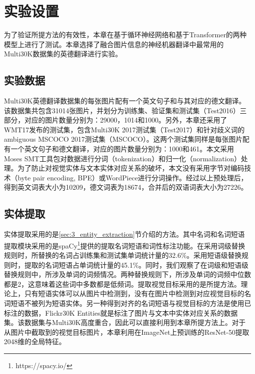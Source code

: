 \section{实验设置}
为了验证所提方法的有效性，本章在基于循环神经网络和基于Transformer的两种模型上进行了测试。本章选择了融合图片信息的神经机器翻译中最常用的Multi30K数据集的英德翻译进行实验。

\subsection{实验数据}
Multi30K英德翻译数据集的每张图片配有一个英文句子和与其对应的德文翻译。该数据集共包含31014张图片，并划分为训练集、验证集和测试集（Test2016）三部分，对应的图片数量分别为：29000，1014和1000。另外，本章还采用了WMT17发布的测试集，包含Multi30K 2017测试集（Test2017）和针对歧义词的ambiguous MSCOCO 2017测试集（MSCOCO）。这两个测试集同样是每张图片配有一个英文句子和德文翻译，对应的图片数量分别为：1000和461。本文采用Moses SMT工具包对数据进行分词（tokenization）和归一化（normalization）处理。为了防止对视觉实体与文本实体对应关系的破坏，本文没有采用字节对编码技术（byte pair encoding, BPE）或WordPiece进行分词操作。经过以上预处理后，得到英文词表大小为10209，德文词表为18674，合并后的双语词表大小为27226。

\subsection{实体提取}
\label{sec:3_setup_entity_extraction}
实体提取采用的是\ref{sec:3_entity_extraction}节介绍的方法。其中名词和名词短语提取模块采用的是spaCy\footnote{https://spacy.io/}提供的提取名词短语和词性标注功能。在采用词级替换规则时，所替换的名词占训练集和测试集单词统计量的32.6\%。采用短语级替换规则时，提取的名词短语占单词统计量的45.1\%。同时，我们观察了在词级和短语级替换规则中，所涉及单词的词频情况。两种替换规则下，所涉及单词的词频中位数都是2，这意味着这些词中多数都是低频词。提取视觉目标采用的是所提方法。理论上，只有短语实体可以从图片中检测到，没有在图片中检测到对应视觉目标的名词短语不被列为短语实体。另一种得到对齐的名词短语与视觉目标的方法是使用已标注的数据，Flickr30K Entities就是标注了图片与文本中实体对应关系的数据集。该数据集与Multi30K高度重合，因此可以直接利用到本章所提方法上。对于从图片中截取到的视觉目标图片，本章利用在ImageNet上预训练的ResNet-50提取2048维的全局特征。

